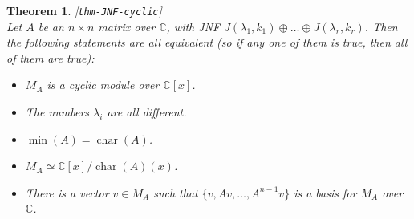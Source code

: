 \documentclass{amsart}
\newcommand{\lbl}[1]{\label{#1}\textup{[\texttt{#1}]}\ \\}
\newcommand{\lbl}{\label}
\newcommand{\chr}       {\operatorname{char}}
\newcommand{\C}         {{\mathbb{C}}}
\newcommand{\lm}        {\lambda}
\newcommand{\tm}        {\times}
\newcommand{\op}        {\oplus}
\renewcommand{\:}{\colon}
\newtheorem{theorem}{Theorem}[section]
\theoremstyle{definition}
\begin{document}
\begin{theorem}\lbl{thm-JNF-cyclic}
 Let $A$ be an $n\tm n$ matrix over $\C$, with JNF
 $J(\lm_1,k_1)\op\ldots\op J(\lm_r,k_r)$.  Then the following
 statements are all equivalent (so if any one of them is true, then
 all of them are true):
 \begin{itemize}
  \item[(a)] $M_A$ is a cyclic module over $\C[x]$.
  \item[(b)] The numbers $\lm_i$ are all different.
  \item[(c)] $\min(A)=\chr(A)$.
  \item[(d)] $M_A\simeq\C[x]/\chr(A)(x)$.
  \item[(e)] There is a vector $v\in M_A$ such that
   $\{v,Av,\ldots,A^{n-1}v\}$ is a basis for $M_A$ over $\C$.
 \end{itemize}
\end{theorem}
\end{document}
